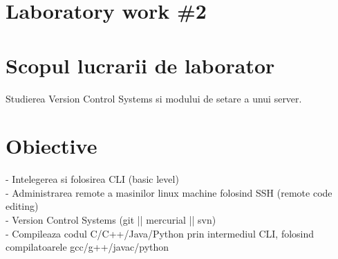 \section*{Laboratory work \#2}

\section{Scopul lucrarii de laborator}
Studierea Version Control Systems si modului de setare a unui server.
\section{Obiective}

\begin{flushleft}
		- Intelegerea si folosirea CLI (basic level)\\
\indent 
- Administrarea remote a masinilor linux machine folosind SSH (remote code editing)\\
\indent 
- Version Control Systems (git || mercurial || svn)\\
\indent 
- Compileaza codul C/C++/Java/Python prin intermediul CLI, folosind compilatoarele gcc/g++/javac/python
\end{flushleft}

\clearpage